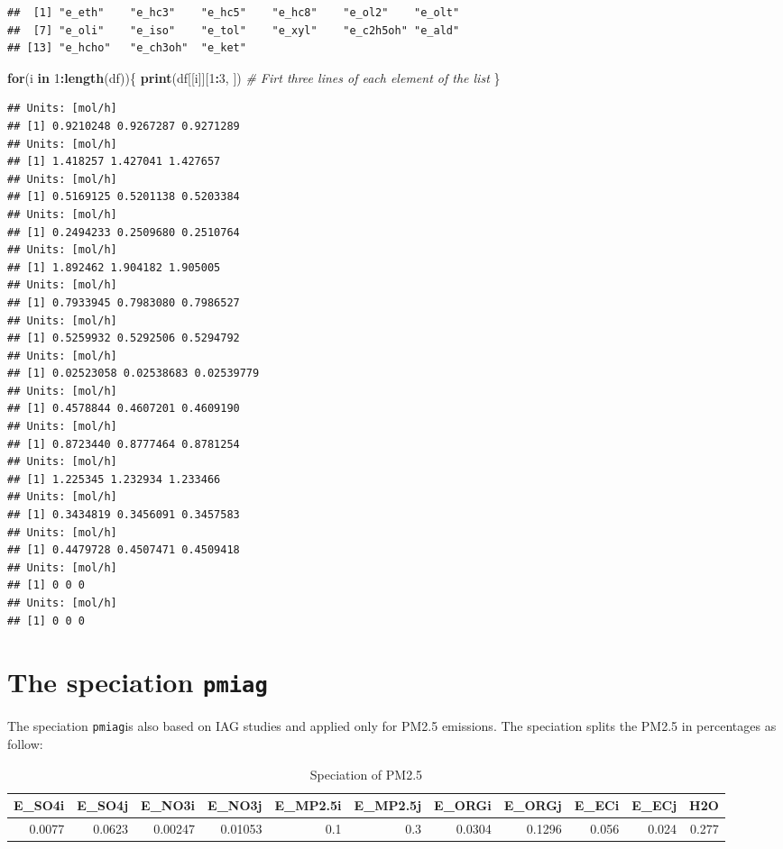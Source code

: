 \documentclass[12pt,graybox,envcountchap,sectrefs]{krantz}
\makeatletter
\newenvironment{Shaded}{\begin{snugshade}}{\end{snugshade}}
\newcommand{\KeywordTok}[1]{\textcolor[rgb]{0.13,0.29,0.53}{\textbf{#1}}}
\newcommand{\DecValTok}[1]{\textcolor[rgb]{0.00,0.00,0.81}{#1}}
\newcommand{\CommentTok}[1]{\textcolor[rgb]{0.56,0.35,0.01}{\textit{#1}}}
\newcommand{\ControlFlowTok}[1]{\textcolor[rgb]{0.13,0.29,0.53}{\textbf{#1}}}
\newcommand{\OperatorTok}[1]{\textcolor[rgb]{0.81,0.36,0.00}{\textbf{#1}}}
\newcommand{\NormalTok}[1]{#1}
\newenvironment{kframe}{%
\medskip{}
\setlength{\fboxsep}{.8em}
 \def\at@end@of@kframe{}%
 \ifinner\ifhmode%
  \def\at@end@of@kframe{\end{minipage}}%
  \begin{minipage}{\columnwidth}%
 \fi\fi%
 \def\FrameCommand##1{\hskip\@totalleftmargin \hskip-\fboxsep
 \colorbox{shadecolor}{##1}\hskip-\fboxsep
     \hskip-\linewidth \hskip-\@totalleftmargin \hskip\columnwidth}%
 \MakeFramed {\advance\hsize-\width
   \@totalleftmargin\z@ \linewidth\hsize
   \@setminipage}}%
 {\par\unskip\endMakeFramed%
 \at@end@of@kframe}
\renewenvironment{Shaded}{\begin{kframe}}{\end{kframe}}
\theoremstyle{definition}
\theoremstyle{definition}
\theoremstyle{definition}
\theoremstyle{remark}
\makeatother
\begin{document}
\begin{verbatim}
##  [1] "e_eth"    "e_hc3"    "e_hc5"    "e_hc8"    "e_ol2"    "e_olt"   
##  [7] "e_oli"    "e_iso"    "e_tol"    "e_xyl"    "e_c2h5oh" "e_ald"   
## [13] "e_hcho"   "e_ch3oh"  "e_ket"
\end{verbatim}

\begin{Shaded}
\begin{Highlighting}[]
\ControlFlowTok{for}\NormalTok{(i }\ControlFlowTok{in} \DecValTok{1}\OperatorTok{:}\KeywordTok{length}\NormalTok{(df))\{}
  \KeywordTok{print}\NormalTok{(df[[i]][}\DecValTok{1}\OperatorTok{:}\DecValTok{3}\NormalTok{, ]) }\CommentTok{# Firt three lines of each element of the list}
\NormalTok{\}}
\end{Highlighting}
\end{Shaded}

\begin{verbatim}
## Units: [mol/h]
## [1] 0.9210248 0.9267287 0.9271289
## Units: [mol/h]
## [1] 1.418257 1.427041 1.427657
## Units: [mol/h]
## [1] 0.5169125 0.5201138 0.5203384
## Units: [mol/h]
## [1] 0.2494233 0.2509680 0.2510764
## Units: [mol/h]
## [1] 1.892462 1.904182 1.905005
## Units: [mol/h]
## [1] 0.7933945 0.7983080 0.7986527
## Units: [mol/h]
## [1] 0.5259932 0.5292506 0.5294792
## Units: [mol/h]
## [1] 0.02523058 0.02538683 0.02539779
## Units: [mol/h]
## [1] 0.4578844 0.4607201 0.4609190
## Units: [mol/h]
## [1] 0.8723440 0.8777464 0.8781254
## Units: [mol/h]
## [1] 1.225345 1.232934 1.233466
## Units: [mol/h]
## [1] 0.3434819 0.3456091 0.3457583
## Units: [mol/h]
## [1] 0.4479728 0.4507471 0.4509418
## Units: [mol/h]
## [1] 0 0 0
## Units: [mol/h]
## [1] 0 0 0
\end{verbatim}

\section{\texorpdfstring{The speciation
\texttt{pmiag}}{The speciation pmiag}}\label{the-speciation-pmiag}

The speciation \texttt{pmiag}is also based on IAG studies and applied
only for PM2.5 emissions. The speciation splits the PM2.5 in percentages
as follow:

\begin{table}

\caption{\label{tab:unnamed-chunk-105}Speciation of PM2.5}
\centering
\begin{tabular}[t]{r|r|r|r|r|r|r|r|r|r|r}
\hline
E\_SO4i & E\_SO4j & E\_NO3i & E\_NO3j & E\_MP2.5i & E\_MP2.5j & E\_ORGi & E\_ORGj & E\_ECi & E\_ECj & H2O\\
\hline
0.0077 & 0.0623 & 0.00247 & 0.01053 & 0.1 & 0.3 & 0.0304 & 0.1296 & 0.056 & 0.024 & 0.277\\
\hline
\end{tabular}
\end{table}
\end{document}
